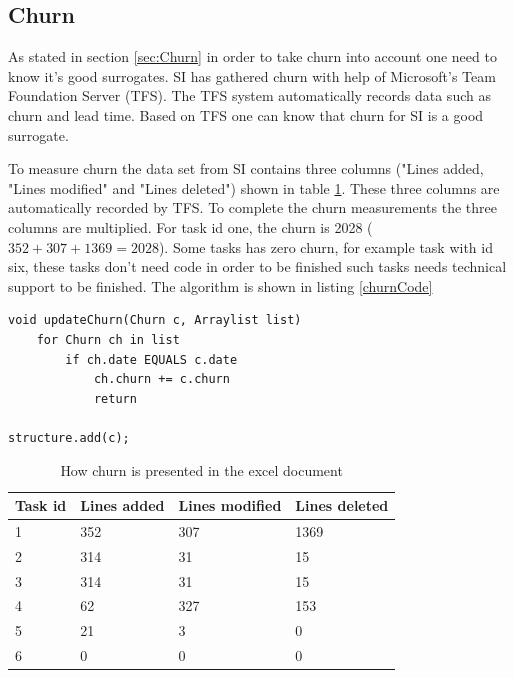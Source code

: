 \documentclass[UKenglish]{ifimaster}  %
\begin{document}
\subsection{Churn}
\label{sec:churn}
As stated in section \ref{sec:Churn} in order to take churn into account one need to know it's good surrogates. SI has gathered churn with help of Microsoft's Team Foundation Server (TFS). The TFS system automatically records data such as churn and lead time. Based on TFS one can know that churn for SI is a good surrogate.

To measure churn the data set from SI contains three columns ("Lines added, "Lines modified" and "Lines deleted") shown in table \ref{table:churn}. These three columns are automatically recorded by TFS.  To complete the churn measurements the three columns are multiplied.  For task id one, the churn is 2028 ($352+307+1369 = 2028$). Some tasks has zero churn, for example task with id six, these tasks don't need code in order to be finished such tasks needs technical support to be finished. The algorithm is shown in listing \ref{churnCode}

\begin{minipage}{\textwidth}
\begin{lstlisting}[caption=Pseudocode example of how throughput is measured, label=churnCode]
void updateChurn(Churn c, Arraylist list)
	for Churn ch in list
		if ch.date EQUALS c.date
			ch.churn += c.churn
			return
			
structure.add(c);
\end{lstlisting}
 \end{minipage}

\begin{table}[!ht]
\begin{center}
    \begin{tabular}{| l | l | l | l |}
    \hline
    Task id & Lines added & Lines modified  & Lines deleted \\ \hline
1&352&307&1369\\ \hline
2&314 & 31 & 15 \\ \hline
3&314&31 & 15\\ \hline
4&62&327&153 \\ \hline
5&21&3&0 \\ \hline
6&0&0&0 \\ \hline
\end{tabular}
\caption{How churn is presented in the excel document}
\label{table:churn} %
\end{center}
\end{table}
\end{document}
